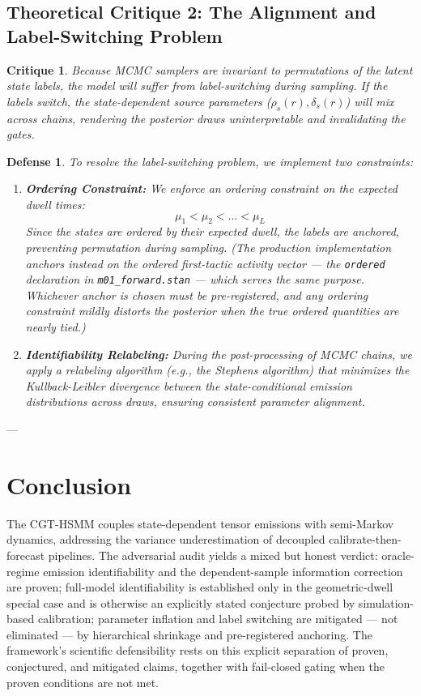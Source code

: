 \documentclass[11pt,a4paper]{article}
\newtheorem{critique}{Critique}
\newtheorem{defense}{Defense}
\begin{document}
\subsection{Theoretical Critique 2: The Alignment and Label-Switching Problem}
\begin{critique}
Because MCMC samplers are invariant to permutations of the latent state labels, the model will suffer from label-switching during sampling. If the labels switch, the state-dependent source parameters ($\rho_s(r), \delta_s(r)$) will mix across chains, rendering the posterior draws uninterpretable and invalidating the gates.
\end{critique}

\begin{defense}
To resolve the label-switching problem, we implement two constraints:
\begin{enumerate}
    \item \textbf{Ordering Constraint:} We enforce an ordering constraint on the expected dwell times:
    \[
    \mu_1 < \mu_2 < \dots < \mu_L
    \]
    Since the states are ordered by their expected dwell, the labels are anchored, preventing permutation during sampling. (The production implementation anchors instead on the ordered first-tactic activity vector --- the \texttt{ordered} declaration in \texttt{m01\_forward.stan} --- which serves the same purpose. Whichever anchor is chosen must be pre-registered, and any ordering constraint mildly distorts the posterior when the true ordered quantities are nearly tied.) %
    \item \textbf{Identifiability Relabeling:} During the post-processing of MCMC chains, we apply a relabeling algorithm (e.g., the Stephens algorithm) that minimizes the Kullback-Leibler divergence between the state-conditional emission distributions across draws, ensuring consistent parameter alignment.
\end{enumerate}
\end{defense}

---

\section{Conclusion}
The CGT-HSMM couples state-dependent tensor emissions with semi-Markov dynamics, addressing the variance underestimation of decoupled calibrate-then-forecast pipelines. The adversarial audit yields a mixed but honest verdict: oracle-regime emission identifiability and the dependent-sample information correction are proven; full-model identifiability is established only in the geometric-dwell special case and is otherwise an explicitly stated conjecture probed by simulation-based calibration; parameter inflation and label switching are mitigated --- not eliminated --- by hierarchical shrinkage and pre-registered anchoring. The framework's scientific defensibility rests on this explicit separation of proven, conjectured, and mitigated claims, together with fail-closed gating when the proven conditions are not met. %
\end{document}
